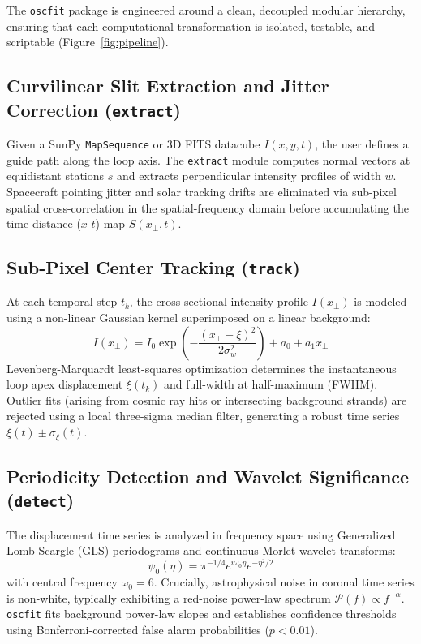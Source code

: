 \documentclass[11pt,a4paper]{article}
\begin{document}
The \texttt{oscfit} package is engineered around a clean, decoupled modular hierarchy, ensuring that each computational transformation is isolated, testable, and scriptable (Figure~\ref{fig:pipeline}).

\subsection{Curvilinear Slit Extraction and Jitter Correction (\texttt{extract})}

Given a SunPy \texttt{MapSequence} or 3D FITS datacube $I(x, y, t)$, the user defines a guide path along the loop axis. The \texttt{extract} module computes normal vectors at equidistant stations $s$ and extracts perpendicular intensity profiles of width $w$. Spacecraft pointing jitter and solar tracking drifts are eliminated via sub-pixel spatial cross-correlation in the spatial-frequency domain before accumulating the time-distance ($x$-$t$) map $S(x_\perp, t)$.

\subsection{Sub-Pixel Center Tracking (\texttt{track})}

At each temporal step $t_k$, the cross-sectional intensity profile $I(x_\perp)$ is modeled using a non-linear Gaussian kernel superimposed on a linear background:
\begin{equation}
    I(x_\perp) = I_0 \exp\left(-\frac{(x_\perp - \xi)^2}{2\sigma_w^2}\right) + a_0 + a_1 x_\perp
\end{equation}
Levenberg-Marquardt least-squares optimization determines the instantaneous loop apex displacement $\xi(t_k)$ and full-width at half-maximum (FWHM). Outlier fits (arising from cosmic ray hits or intersecting background strands) are rejected using a local three-sigma median filter, generating a robust time series $\xi(t) \pm \sigma_\xi(t)$.

\subsection{Periodicity Detection and Wavelet Significance (\texttt{detect})}

The displacement time series is analyzed in frequency space using Generalized Lomb-Scargle (GLS) periodograms and continuous Morlet wavelet transforms:
\begin{equation}
    \psi_0(\eta) = \pi^{-1/4} e^{i\omega_0 \eta} e^{-\eta^2 / 2}
\end{equation}
with central frequency $\omega_0 = 6$. Crucially, astrophysical noise in coronal time series is non-white, typically exhibiting a red-noise power-law spectrum $\mathcal{P}(f) \propto f^{-\alpha}$. \texttt{oscfit} fits background power-law slopes and establishes confidence thresholds using Bonferroni-corrected false alarm probabilities ($p < 0.01$).
\end{document}
